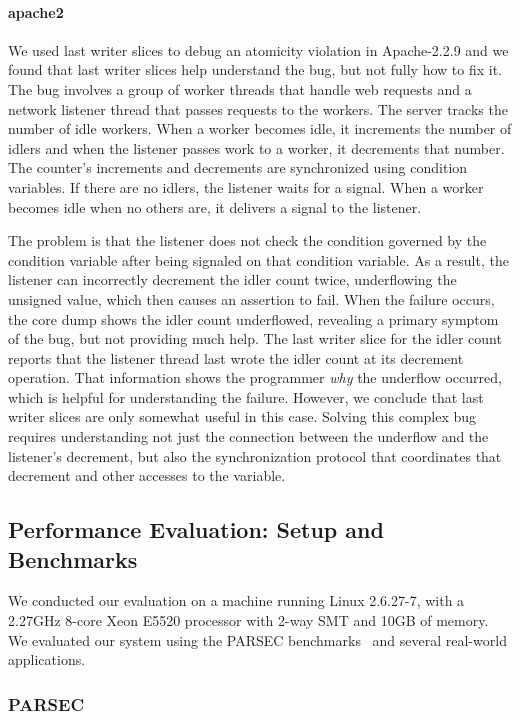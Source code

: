 \documentclass[pageno,nohyperref]{jpaper}
\begin{document}
\paragraph{apache2}
We used last writer slices to debug an atomicity violation in Apache-2.2.9 and
we found that last writer slices help understand the bug, but not fully how to fix
it.  The bug involves a group of worker threads that handle web requests and a
network listener thread that passes requests to the workers.  The server tracks
the number of idle workers.  When a worker becomes idle, it increments the
number of idlers and when the listener passes work to a worker, it decrements
that number.  The counter's increments and decrements are synchronized using
condition variables.  If there are no idlers, the listener waits for a signal.
When a worker becomes idle when no others are, it delivers a signal to the
listener.

The problem is that the listener does not check the condition governed by the
condition variable after being signaled on that condition variable.  As a
result, the listener can incorrectly decrement the idler count twice,
underflowing the unsigned value, which then causes an assertion to fail.  When
the failure occurs, the core dump shows the idler count underflowed, revealing
a primary symptom of the bug, but not providing much help.  The last
writer slice for the idler count reports that the listener thread last
wrote the idler count at its decrement operation.  That information shows the programmer
{\em why} the underflow occurred, which is helpful for understanding the
failure.  However, we conclude that last writer slices are only somewhat 
useful in this case.  Solving this complex bug requires understanding not just
the connection between the underflow and the listener's decrement, but also the
synchronization protocol that coordinates that decrement and other accesses to
the variable.  

\subsection{Performance Evaluation: Setup and Benchmarks}

We conducted our evaluation on a machine running Linux 2.6.27-7, with a 2.27GHz
8-core Xeon E5520 processor with 2-way SMT and 10GB of memory.  We evaluated
our system using the PARSEC benchmarks~\cite{parsec} and several 
real-world applications.    

\subsubsection{PARSEC}
\end{document}
